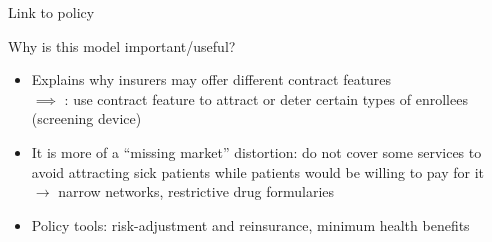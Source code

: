 \begin{frame}{Link to policy}

    Why is this model important/useful?
    \begin{itemize}
        \item Explains why insurers may offer different contract features\\
        $\implies$ : use contract feature to attract or deter certain types of enrollees (screening device)
        \item It is more of a ``missing market'' distortion: do not cover some services to avoid attracting sick patients while patients would be willing to pay for it\\
        $\rightarrow$ narrow networks, restrictive drug formularies
        \item Policy tools: risk-adjustment and reinsurance, minimum health benefits
    \end{itemize}
\end{frame}


